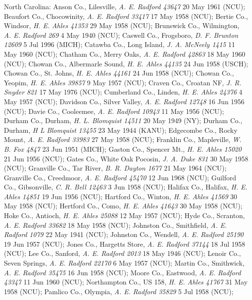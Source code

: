 \documentclass{article}
\begin{document}
North Carolina:
Anson Co., Lilesville, \textit{A. E. Radford 43647} 20 May 1961 (NCU);
Beaufort Co., Chocowinity, \textit{A. E. Radford 33417} 17 May 1958 (NCU);
Bertie Co., Windsor, \textit{H. E. Ahles 41353} 29 May 1958 (NCU);
Brunswick Co., Wilmington, \textit{A. E. Radford 269} 4 May 1940 (NCU);
Caswell Co., Frogsboro, \textit{D. F. Brunton 12609} 5 Jul 1996 (MICH);
Catawba Co., Long Island, \textit{J. A. McNeely 1415} 11 May 1960 (NCU);
Chatham Co., Merry Oaks, \textit{A. E. Radford 42863} 18 May 1960 (NCU);
Chowan Co., Albermarle Sound, \textit{H. E. Ahles 44135} 24 Jun 1958 (USCH);
Chowan Co., St. Johns, \textit{H. E. Ahles 44161} 24 Jun 1958 (NCU);
Chowan Co., Yeopim, \textit{H. E. Ahles 39857} 9 May 1957 (NCU);
Craven Co., Croatan NF, \textit{J. R. Snyder 821} 17 May 1976 (NCU);
Cumberland Co., Linden, \textit{H. E. Ahles 24376} 4 May 1957 (NCU);
Davidson Co., Silver Valley, \textit{A. E. Radford 12748} 16 Jun 1956 (NCU);
Davie Co., Cooleemee, \textit{A. E. Radford 10943} 11 May 1956 (NCU);
Durham Co., Durham, \textit{H. L. Blomquist 14511} 20 May 1949 (NY);
Durham Co., Durham, \textit{H L Blomquist 13455} 23 May 1944 (KANU);
Edgecombe Co., Rocky Mount, \textit{A. E. Radford 33983} 27 May 1958 (NCU);
Franklin Co., Mapleville, \textit{W. B. Fox 4847} 23 Jun 1951 (MICH);
Gaston Co., Spencer Mt., \textit{H. E. Ahles 15020} 21 Jun 1956 (NCU);
Gates Co., White Oak Pocosin, \textit{J. A. Duke 831} 30 May 1958 (NCU);
Granville Co., Tar River, \textit{B. R. Dayton 1677} 21 May 1964 (NCU);
Granville Co., Creedmoor, \textit{A. E. Radford 45470} 12 Jun 1968 (NCU);
Guilford Co., Gibsonville, \textit{C. R. Bell 12463} 3 Jun 1958 (NCU);
Halifax Co., Halifax, \textit{H. E. Ahles 14851} 19 Jun 1956 (NCU);
Hartford Co., Winton, \textit{H. E. Ahles 41569} 30 May 1958 (NCU);
Hertford Co., Como, \textit{H. E. Ahles 41643} 30 May 1958 (NCU);
Hoke Co., Antioch, \textit{H. E. Ahles 25088} 12 May 1957 (NCU);
Hyde Co., Scranton, \textit{A. E. Radford 33682} 18 May 1958 (NCU);
Johnston Co., Smithfield, \textit{A. E. Radford 1079} 22 May 1941 (NCU);
Johnston Co., Wendell, \textit{A. E. Radford 25190} 19 Jun 1957 (NCU);
Jones Co., Hargetts Store, \textit{A. E. Radford 37144} 18 Jul 1958 (NCU);
Lee Co., Sanford, \textit{A. E. Radford 2013} 18 May 1946 (NCU);
Lenoir Co., Seven Springs, \textit{A. E. Radford 22170} 6 May 1957 (NCU);
Martin Co., Smithwick, \textit{A. E. Radford 35475} 16 Jun 1958 (NCU);
Moore Co., Eastwood, \textit{A. E. Radford 43347} 11 Jun 1960 (NCU);
Northampton Co., US 158, \textit{H. E. Ahles 41767} 31 May 1958 (NCU);
Pamlico Co., Olympia, \textit{A. E. Radford 35829} 5 Jul 1958 (NCU);
\end{document}
